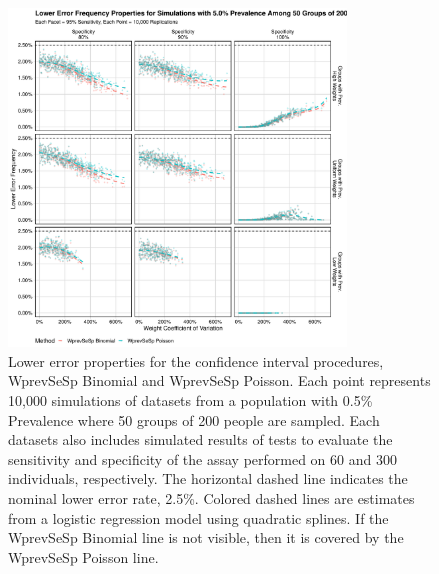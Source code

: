 \documentclass[AMA,STIX1COL]{WileyNJD-v2}
\begin{document}
\begin{figure}
\centering
\includegraphics[width=0.8\textwidth]{figures/imperfect_lower_error_frequency_50_groups_0_05_prev.pdf}
\caption{Lower error properties for the confidence interval procedures, WprevSeSp Binomial and WprevSeSp Poisson.
Each point represents 10,000 simulations of datasets from a population with 0.5\% Prevalence where 50 groups of 200 people are sampled.
Each datasets also includes simulated results of tests to evaluate the sensitivity and specificity of the assay performed on 60 and 300 individuals, respectively.
The horizontal dashed line indicates the nominal lower error rate, 2.5\%.
Colored dashed lines are estimates from a logistic regression model using quadratic splines. If the WprevSeSp Binomial line is not visible, then it is covered by the WprevSeSp Poisson line.}
\label{fig:imperfect_lower_error_frequency_50_groups_0_05_prev}
\end{figure}
\end{document}
